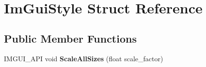 \hypertarget{struct_im_gui_style}{}\section{Im\+Gui\+Style Struct Reference}
\label{struct_im_gui_style}
\subsection*{Public Member Functions}
\begin{DoxyCompactItemize}
\item 
\mbox{\label{struct_im_gui_style_a7c9d3e0974a239f65e433cc952be0627}} 
I\+M\+G\+U\+I\+\_\+\+A\+PI void {\bfseries Scale\+All\+Sizes} (float scale\+\_\+factor)
\end{DoxyCompactItemize}

